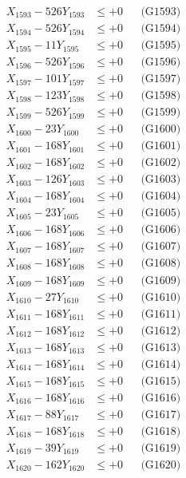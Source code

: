 \documentclass[a4paper,10pt]{article}
\begin{document}
{\begin{align}
X_{1593} - 526Y_{1593} &\leq +0 && \text{(G1593)} \\
X_{1594} - 526Y_{1594} &\leq +0 && \text{(G1594)} \\
X_{1595} - 11Y_{1595} &\leq +0 && \text{(G1595)} \\
X_{1596} - 526Y_{1596} &\leq +0 && \text{(G1596)} \\
X_{1597} - 101Y_{1597} &\leq +0 && \text{(G1597)} \\
X_{1598} - 123Y_{1598} &\leq +0 && \text{(G1598)} \\
X_{1599} - 526Y_{1599} &\leq +0 && \text{(G1599)} \\
X_{1600} - 23Y_{1600} &\leq +0 && \text{(G1600)} \\
\allowbreak
X_{1601} - 168Y_{1601} &\leq +0 && \text{(G1601)} \\
X_{1602} - 168Y_{1602} &\leq +0 && \text{(G1602)} \\
X_{1603} - 126Y_{1603} &\leq +0 && \text{(G1603)} \\
X_{1604} - 168Y_{1604} &\leq +0 && \text{(G1604)} \\
X_{1605} - 23Y_{1605} &\leq +0 && \text{(G1605)} \\
X_{1606} - 168Y_{1606} &\leq +0 && \text{(G1606)} \\
X_{1607} - 168Y_{1607} &\leq +0 && \text{(G1607)} \\
X_{1608} - 168Y_{1608} &\leq +0 && \text{(G1608)} \\
X_{1609} - 168Y_{1609} &\leq +0 && \text{(G1609)} \\
X_{1610} - 27Y_{1610} &\leq +0 && \text{(G1610)} \\
\allowbreak
X_{1611} - 168Y_{1611} &\leq +0 && \text{(G1611)} \\
X_{1612} - 168Y_{1612} &\leq +0 && \text{(G1612)} \\
X_{1613} - 168Y_{1613} &\leq +0 && \text{(G1613)} \\
X_{1614} - 168Y_{1614} &\leq +0 && \text{(G1614)} \\
X_{1615} - 168Y_{1615} &\leq +0 && \text{(G1615)} \\
X_{1616} - 168Y_{1616} &\leq +0 && \text{(G1616)} \\
X_{1617} - 88Y_{1617} &\leq +0 && \text{(G1617)} \\
X_{1618} - 168Y_{1618} &\leq +0 && \text{(G1618)} \\
X_{1619} - 39Y_{1619} &\leq +0 && \text{(G1619)} \\
X_{1620} - 162Y_{1620} &\leq +0 && \text{(G1620)} \\

\end{align}}
\end{document}
